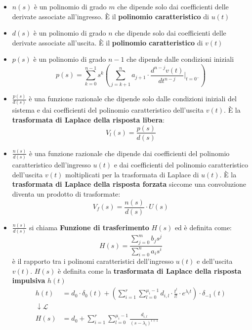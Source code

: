 \documentclass[a4paper]{article}
\begin{document}
\vspace{1em}
\noindent
\begin{itemize}
  \item 
    \( n(s) \) è un polinomio di grado \( m \) che dipende solo dai coefficienti delle derivate
    associate all'ingresso. È il \textbf{polinomio caratteristico} di \( u(t) \)

  \item
    \( d(s) \) è un polinomio di grado \( n \) che dipende solo dai coefficienti delle derivate
    associate all'uscita. È il \textbf{polinomio caratteristico} di \( v(t) \)

  \item \( p(s) \) è un polinomio di grado \( n-1 \) che dipende dalle condizioni iniziali
    \[
      p(s) = \sum_{k=0}^{n-1} s^k \left( \sum_{j=k+1}^{n} a_{j+1} \cdot \frac{d^{n-j} v(t)}{dt^{n-j}} \Big|_{t=0^-} \right)
    \] 

  \item \( \frac{p(s)}{d(s)} \) è una funzione razionale che dipende solo dalle condizioni iniziali
    del sistema e dai coefficienti del polinomio caratteristico dell'uscita \( v(t) \).
    È la \textbf{trasformata di Laplace della risposta libera}:
    \[
      V_l(s) = \frac{p(s)}{d(s)}
    \] 

  \item \( \frac{n(s)}{d(s)} \) è una funzione razionale che dipende dai coefficienti del
    polinomio caratteristico dell'ingresso \( u(t) \) e dai coefficienti
    del polinomio caratteristico dell'uscita \( v(t) \) moltiplicati per la trasformata di 
    Laplace di \( u(t) \). È la \textbf{trasformata di Laplace della
    risposta forzata} siccome una convoluzione diventa un prodotto di trasformate:
    \[
      V_f(s) = \frac{n(s)}{d(s)} \cdot U(s)
    \]

  \item \( \frac{n(s)}{d(s)} \) si chiama \textbf{Funzione di trasferimento} \( H(s) \) ed
    è definita come:
    \[
      H(s) = \frac{\sum_{j=0}^{m} b_j s^{j}}{\sum_{i=0}^{n} a_i s^{i}}
    \] 
    è il rapporto tra i polinomi caratteristici dell'ingresso \( u(t) \) e dell'uscita \( v(t) \).
    \vspace{1em}
    \noindent
    \( H(s) \) è definita come la \textbf{trasformata di Laplace della risposta impulsiva}
    \( h(t) \)
    \[
      \begin{aligned}
        h(t) &= d_0 \cdot \delta_0(t) + \left( \sum_{i=1}^{r} \sum_{l=0}^{\mu_i-1} d_{i,l} \cdot  \frac{t^l}{l!} \cdot e^{\lambda_i t} \right) \cdot \delta_{-1}(t) \\
        \downarrow \mathcal{L}\\
        H(s) &= d_0 + \sum_{i=1}^{r} \sum_{l=0}^{\mu_i-1} \frac{d_{i,l}}{(s- \lambda_i)^{l+1}}
      \end{aligned}
    \] 
\end{itemize}
\end{document}
